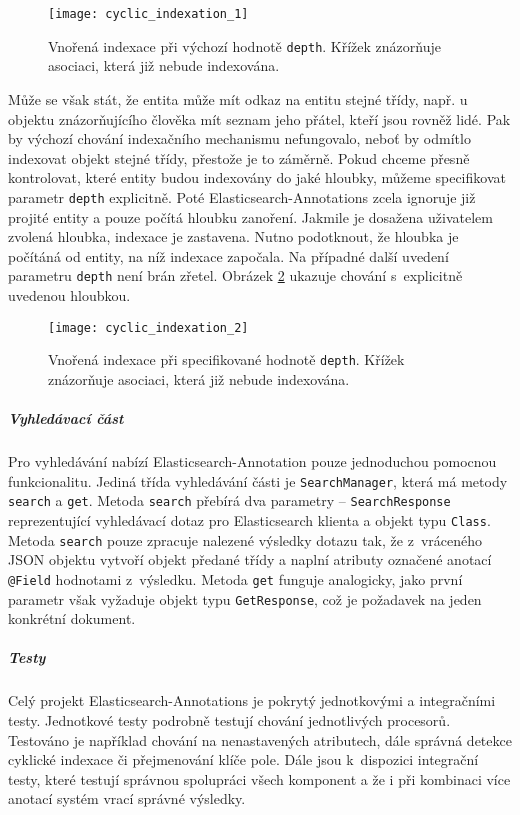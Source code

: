 \documentclass[11pt,oneside]{fithesis2}
\begin{document}
\begin{figure}[h]
	\begin{center}
		\texttt{[image: cyclic\_indexation\_1]}
	\end{center}
	\caption{Vnořená indexace při výchozí hodnotě \texttt{depth}. Křížek znázorňuje asociaci, která již nebude indexována.}	
	\label{CyclicIndexation1}
\end{figure}

Může se však stát, že entita může mít odkaz na entitu stejné třídy, např. u objektu znázorňujícího člověka mít seznam jeho přátel, kteří jsou rovněž lidé. Pak by výchozí chování indexačního mechanismu nefungovalo, neboť by odmítlo indexovat objekt stejné třídy, přestože je to záměrně. Pokud chceme přesně kontrolovat, které entity budou indexovány do jaké hloubky, můžeme specifikovat parametr \texttt{depth} explicitně. Poté Elasticsearch-Annotations zcela ignoruje již projité entity a pouze počítá hloubku zanoření. Jakmile je dosažena uživatelem zvolená hloubka, indexace je zastavena. Nutno podotknout, že hloubka je počítáná od entity, na níž indexace započala. Na případné další uvedení parametru \texttt{depth}  není brán zřetel. Obrázek \ref{CyclicIndexation2} ukazuje chování s~explicitně uvedenou hloubkou.

\begin{figure}[h]
	\begin{center}
		\texttt{[image: cyclic\_indexation\_2]}
	\end{center}
	\caption{Vnořená indexace při specifikované hodnotě \texttt{depth}.  Křížek znázorňuje asociaci, která již nebude indexována.}	
	\label{CyclicIndexation2}
\end{figure}

\subparagraph{Vyhledávací část}
Pro vyhledávání nabízí Elasticsearch-Annotation pouze jednoduchou pomocnou funkcionalitu. Jediná třída vyhledávání části je \texttt{SearchManager}, která má metody \texttt{search} a \texttt{get}. Metoda \texttt{search} přebírá dva parametry -- \texttt{SearchResponse} reprezentující vyhledávací dotaz pro Elasticsearch klienta a objekt typu \texttt{Class}. Metoda \texttt{search} pouze zpracuje nalezené výsledky dotazu tak, že z~vráceného JSON objektu vytvoří objekt předané třídy a naplní atributy označené anotací \texttt{@Field} hodnotami z~výsledku. Metoda \texttt{get} funguje analogicky, jako první parametr však vyžaduje objekt typu \texttt{GetResponse}, což je požadavek na jeden konkrétní dokument.

\subparagraph{Testy}
Celý projekt Elasticsearch-Annotations je pokrytý jednotkovými a integračními testy. Jednotkové testy podrobně testují chování jednotlivých procesorů. Testováno je například chování na nenastavených atributech, dále správná detekce cyklické indexace či přejmenování klíče pole. Dále jsou k~dispozici integrační testy, které testují správnou spolupráci všech komponent a že i při kombinaci více anotací systém vrací správné výsledky. 
\end{document}
